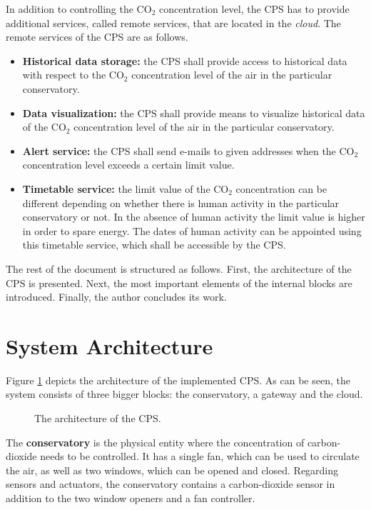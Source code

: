 \documentclass[a4paper, 11pt]{article}
\begin{document}
	In addition to controlling the CO$_2$ concentration level, the CPS has to provide additional services, called remote services, that are located in the \emph{cloud}. The remote services of the CPS are as follows. 
	\begin{itemize}
		\item \textbf{Historical data storage:} the CPS shall provide access to historical data with respect to the CO$_2$ concentration level of the air in the particular conservatory.
		\item \textbf{Data visualization:} the CPS shall provide means to visualize historical data of the CO$_2$ concentration level of the air in the particular conservatory.
		\item \textbf{Alert service:} the CPS shall send e-mails to given addresses when the CO$_2$ concentration level exceeds a certain limit value.
		\item \textbf{Timetable service:} the limit value of the CO$_2$ concentration can be different depending on whether there is human activity in the particular conservatory or not. In the absence of human activity the limit value is higher in order to spare energy. The dates of human activity can be appointed using this timetable service, which shall be accessible by the CPS.
	\end{itemize}
	
	The rest of the document is structured as follows. First, the architecture of the CPS is presented. Next, the most important elements of the internal blocks are introduced. Finally, the author concludes its work.	
	\section{System Architecture}
	Figure \ref{fig:architecture} depicts the architecture of the implemented CPS. As can be seen, the system consists of three bigger blocks: the conservatory, a gateway and the cloud. 
	
	\begin{figure}[h!]
		\center
		\caption{The architecture of the CPS.}
		\label{fig:architecture}
	\end{figure}

	The \textbf{conservatory} is the physical entity where the concentration of carbon-dioxide needs to be controlled. It has a single fan, which can be used to circulate the air, as well as two windows, which can be opened and closed. Regarding sensors and actuators, the conservatory contains a carbon-dioxide sensor in addition to the two window openers and a fan controller.
	
\end{document}
